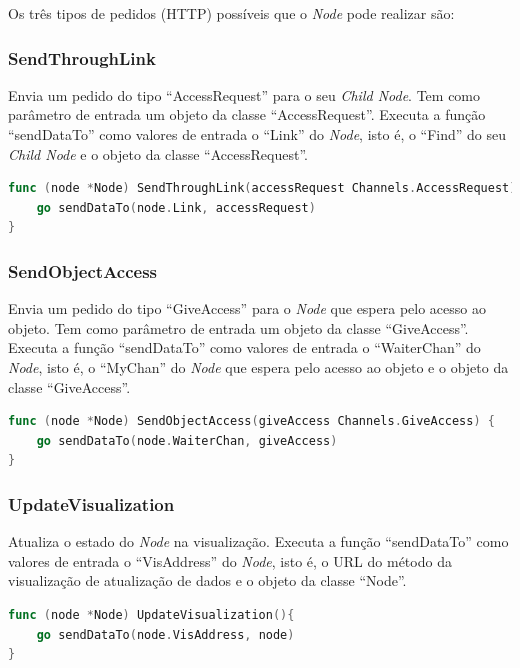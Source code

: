 Os três tipos de pedidos (\acs{HTTP}) possíveis que o \emph{Node} pode realizar são:

\subsubsection*{SendThroughLink}
Envia um pedido do tipo ``AccessRequest'' para o seu \emph{Child Node}.
Tem como parâmetro de entrada um objeto da classe ``AccessRequest''.
Executa a função ``sendDataTo'' como valores de entrada o ``Link'' do \emph{Node}, isto é, o ``Find'' do seu \emph{Child Node}
e o objeto da classe ``AccessRequest''.

\begin{lstlisting}[caption={Método ``SendThroughLink''},language=Go]
func (node *Node) SendThroughLink(accessRequest Channels.AccessRequest) {
	go sendDataTo(node.Link, accessRequest)
}
\end{lstlisting}


\subsubsection*{SendObjectAccess}
Envia um pedido do tipo ``GiveAccess'' para o \emph{Node} que espera pelo acesso ao objeto.
Tem como parâmetro de entrada um objeto da classe ``GiveAccess''.
Executa a função ``sendDataTo'' como valores de entrada o ``WaiterChan'' do \emph{Node}, isto é, o ``MyChan'' do \emph{Node} que espera pelo acesso ao objeto
e o objeto da classe ``GiveAccess''.

\begin{lstlisting}[caption={Método ``SendObjectAccess''},language=Go]
func (node *Node) SendObjectAccess(giveAccess Channels.GiveAccess) {
	go sendDataTo(node.WaiterChan, giveAccess)
}

\end{lstlisting}

\subsubsection*{UpdateVisualization}
Atualiza o estado do \emph{Node} na visualização.
Executa a função ``sendDataTo'' como valores de entrada o ``VisAddress'' do \emph{Node}, isto é, o \acs{URL} do método da visualização de atualização de dados
e o objeto da classe ``Node''.

\begin{lstlisting}[caption={Método ``UpdateVisualization''},language=Go]
func (node *Node) UpdateVisualization(){
	go sendDataTo(node.VisAddress, node)
}
\end{lstlisting}


